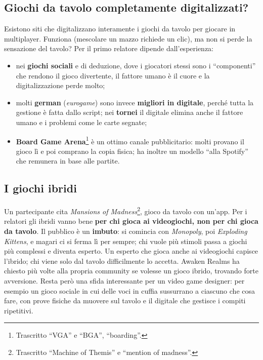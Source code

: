 \subsection{Giochi da tavolo completamente digitalizzati?}

Esistono siti che digitalizzano interamente i giochi da tavolo per giocare in
multiplayer. Funziona (mescolare un mazzo richiede un clic), ma non si perde la
sensazione del tavolo? Per il primo relatore dipende dall'esperienza:
\begin{itemize}
  \item nei \textbf{giochi sociali} e di deduzione, dove i giocatori stessi sono i
        ``componenti'' che rendono il gioco divertente, il fattore umano è il cuore
        e la digitalizzazione perde molto;
  \item molti \textbf{german} (\emph{eurogame}) sono invece \textbf{migliori in
        digitale}, perché tutta la gestione è fatta dallo script; nei
        \textbf{tornei} il digitale elimina anche il fattore umano e i problemi come
        le carte segnate;
  \item \textbf{Board Game Arena}\footnote{Trascritto ``VGA'' e ``BGA'',
        ``boarding''.} è un ottimo canale pubblicitario: molti provano il gioco lì e
        poi comprano la copia fisica; ha inoltre un modello ``alla Spotify'' che
        remunera in base alle partite.
\end{itemize}

\subsection{I giochi ibridi}

Un partecipante cita \emph{Mansions of Madness}\footnote{Trascritto ``Machine of
Themis'' e ``mention of madness''.}, gioco da tavolo con un'app. Per i relatori gli
ibridi vanno bene \textbf{per chi gioca ai videogiochi, non per chi gioca da
tavolo}. Il pubblico è un \textbf{imbuto}: si comincia con \emph{Monopoly}, poi
\emph{Exploding Kittens}, e magari ci si ferma lì per sempre; chi vuole più
stimoli passa a giochi più complessi e diventa esperto. Un esperto che gioca anche
ai videogiochi capisce l'ibrido; chi viene solo dal tavolo difficilmente lo
accetta. Awaken Realms ha chiesto più volte alla propria community se volesse un
gioco ibrido, trovando forte avversione. Resta però una sfida interessante per un
video game designer: per esempio un gioco sociale in cui delle voci in cuffia
sussurrano a ciascuno che cosa fare, con prove fisiche da muovere sul tavolo e il
digitale che gestisce i compiti ripetitivi.

